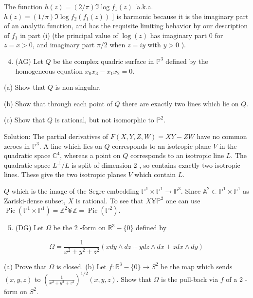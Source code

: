 \documentclass[10pt]{article}
\begin{document}
The function $h(z)=(2 / \pi) \Im \log f_{1}(z)$ [a.k.a. $h(z)=(1 / \pi) \Im \log f_{2}\left(f_{1}(z)\right)$ ] is harmonic because it is the imaginary part of an analytic function, and has the requisite limiting behavior by our description of $f_{1}$ in part (i) (the principal value of $\log (z)$ has imaginary part 0 for $z=x>0$, and imaginary part $\pi / 2$ when $z=i y$ with $y>0$ ).

\begin{enumerate}
  \setcounter{enumi}{3}
  \item (AG) Let $Q$ be the complex quadric surface in $\mathbb{P}^{3}$ defined by the homogeneous equation $x_{0} x_{3}-x_{1} x_{2}=0$.
\end{enumerate}

(a) Show that $Q$ is non-singular.

(b) Show that through each point of $Q$ there are exactly two lines which lie on $Q$.

(c) Show that $Q$ is rational, but not isomorphic to $\mathbb{P}^{2}$.

Solution: The partial derivatives of $F(X, Y, Z, W)=X Y-Z W$ have no common zeroes in $\mathbb{P}^{3}$. A line which lies on $Q$ corresponds to an isotropic plane $V$ in the quadratic space $\mathbb{C}^{4}$, whereas a point on $Q$ corresponds to an isotropic line $L$. The quadratic space $L^{\perp} / L$ is split of dimension 2 , so contains exactly two isotropic lines. These give the two isotropic planes $V$ which contain $L$.

$Q$ which is the image of the Segre embedding $\mathbb{P}^{1} \times \mathbb{P}^{1} \rightarrow \mathbb{P}^{3}$. Since $\mathbb{A}^{2} \subset \mathbb{P}^{1} \times \mathbb{P}^{1}$ as Zariski-dense subset, $X$ is rational. To see that $X ¥ \mathbb{P}^{2}$ one can use $\operatorname{Pic}\left(\mathbb{P}^{1} \times \mathbb{P}^{1}\right)=\mathbb{Z}^{2} ¥ \mathbb{Z}=\operatorname{Pic}\left(\mathbb{P}^{2}\right)$.

\begin{enumerate}
  \setcounter{enumi}{4}
  \item (DG) Let $\Omega$ be the 2 -form on $\mathbb{R}^{3}-\{0\}$ defined by
\end{enumerate}

$$
\Omega=\frac{1}{x^{2}+y^{2}+z^{2}}(x d y \wedge d z+y d z \wedge d x+z d x \wedge d y)
$$

(a) Prove that $\Omega$ is closed.
(b) Let $f: \mathbb{R}^{3}-\{0\} \rightarrow S^{2}$ be the map which sends $(x, y, z)$ to $\left(\frac{1}{x^{2}+y^{2}+z^{2}}\right)^{1 / 2}(x, y, z)$. Show that $\Omega$ is the pull-back via $f$ of a 2 -form on $S^{2}$.
\end{document}
